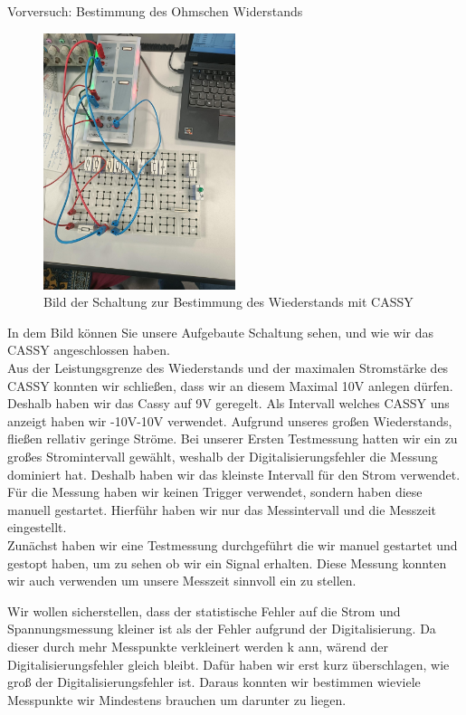 \documentclass[twoside]{protokoll}
\begin{document}
\begin{aufgabe}{Vorversuch: Bestimmung des Ohmschen Widerstands}
  \begin{figure}[H]
  \centering
  \includegraphics[width=0.5\textwidth]{Bilder_Osziloskop/Schaltung_CASSY_R.pdf}
  \caption{Bild der Schaltung zur Bestimmung des Wiederstands mit CASSY}
  \centering
  \end{figure}
  
In dem Bild können Sie unsere Aufgebaute Schaltung sehen, und wie wir das CASSY angeschlossen haben. \\
   
Aus der Leistungsgrenze des Wiederstands und der maximalen Stromstärke des CASSY konnten wir schließen, dass wir an diesem Maximal 10V anlegen dürfen. Deshalb haben wir das Cassy auf 9V geregelt. 
Als Intervall welches CASSY uns anzeigt haben wir -10V-10V verwendet. 
Aufgrund unseres großen Wiederstands, fließen rellativ geringe Ströme. 
Bei unserer Ersten Testmessung hatten wir ein zu großes Stromintervall gewählt, weshalb der Digitalisierungsfehler die Messung dominiert hat. Deshalb haben wir das kleinste Intervall für den Strom verwendet. 
 Für die Messung haben wir keinen Trigger verwendet, sondern haben diese manuell gestartet. Hierführ haben wir nur das Messintervall und die Messzeit eingestellt. \\
 Zunächst haben wir eine Testmessung durchgeführt die wir manuel gestartet und gestopt haben, um zu sehen ob wir ein Signal erhalten. 
Diese Messung konnten wir auch verwenden um unsere Messzeit sinnvoll ein zu stellen. 
 

 Wir wollen sicherstellen, dass der statistische Fehler auf die Strom und Spannungsmessung kleiner ist als der Fehler aufgrund der Digitalisierung. 
 Da dieser durch mehr Messpunkte verkleinert werden k ann, wärend der Digitalisierungsfehler gleich bleibt.
 Dafür haben wir erst kurz überschlagen, wie groß der Digitalisierungsfehler ist. Daraus konnten wir bestimmen wieviele Messpunkte wir Mindestens brauchen um darunter zu liegen. 
 

\end{aufgabe}
\end{document}
